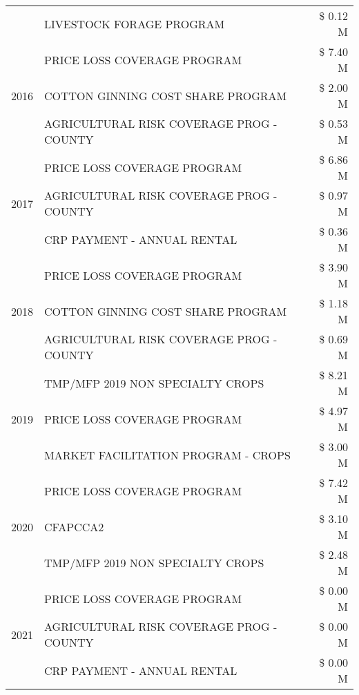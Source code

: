 \begin{tabular}{llr}
 & LIVESTOCK FORAGE PROGRAM & \$ 0.12 M \\
\cline{1-3}
\multirow[t]{3}{*}{2016} & PRICE LOSS COVERAGE PROGRAM                   & \$ 7.40 M \\
 & COTTON GINNING COST SHARE PROGRAM             & \$ 2.00 M \\
 & AGRICULTURAL RISK COVERAGE PROG - COUNTY      & \$ 0.53 M \\
\cline{1-3}
\multirow[t]{3}{*}{2017} & PRICE LOSS COVERAGE PROGRAM & \$ 6.86 M \\
 & AGRICULTURAL RISK COVERAGE PROG - COUNTY & \$ 0.97 M \\
 & CRP PAYMENT - ANNUAL RENTAL & \$ 0.36 M \\
\cline{1-3}
\multirow[t]{3}{*}{2018} & PRICE LOSS COVERAGE PROGRAM & \$ 3.90 M \\
 & COTTON GINNING COST SHARE PROGRAM & \$ 1.18 M \\
 & AGRICULTURAL RISK COVERAGE PROG - COUNTY & \$ 0.69 M \\
\cline{1-3}
\multirow[t]{3}{*}{2019} & TMP/MFP 2019 NON SPECIALTY CROPS & \$ 8.21 M \\
 & PRICE LOSS COVERAGE PROGRAM & \$ 4.97 M \\
 & MARKET FACILITATION PROGRAM - CROPS & \$ 3.00 M \\
\cline{1-3}
\multirow[t]{3}{*}{2020} & PRICE LOSS COVERAGE PROGRAM & \$ 7.42 M \\
 & CFAPCCA2 & \$ 3.10 M \\
 & TMP/MFP 2019 NON SPECIALTY CROPS & \$ 2.48 M \\
\cline{1-3}
\multirow[t]{3}{*}{2021} & PRICE LOSS COVERAGE PROGRAM & \$ 0.00 M \\
 & AGRICULTURAL RISK COVERAGE PROG - COUNTY & \$ 0.00 M \\
 & CRP PAYMENT - ANNUAL RENTAL & \$ 0.00 M \\
\cline{1-3}
\bottomrule
\end{tabular}
